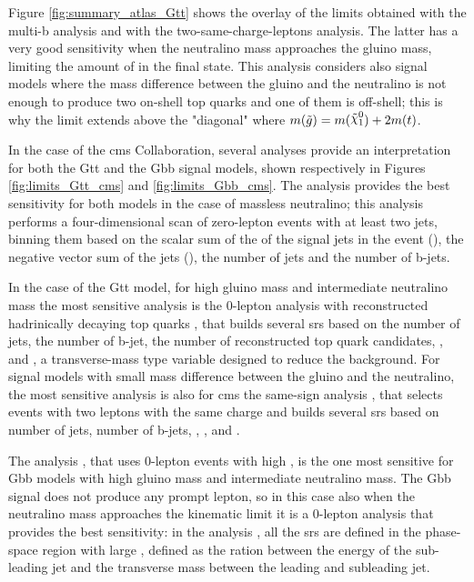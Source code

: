 Figure \ref{fig:summary_atlas_Gtt} shows the overlay of the limits obtained with the multi-b analysis and with the two-same-charge-leptons analysis.
The latter has a very good sensitivity when the neutralino mass approaches the gluino mass,
limiting the amount of \met in the final state.
This analysis considers also signal models where the mass difference between the gluino and the neutralino 
is not enough to produce two on-shell top quarks and one of them is off-shell; this is why the limit extends above 
the "diagonal" where $m(\tilde{g}) = m(\ninoone) + 2 m(t)$.


In the case of the \gls{cms} Collaboration, several analyses provide an interpretation for both the Gtt and 
the Gbb signal models, shown respectively in Figures \ref{fig:limits_Gtt_cms} and \ref{fig:limits_Gbb_cms}.
The \htmiss analysis \cite{Sirunyan:2017cwe} provides the best sensitivity for both models in the case of massless 
neutralino; this analysis performs a four-dimensional scan of zero-lepton events with at least two jets, binning them 
based on the scalar sum of the \pt of the signal jets in the event (\Ht), the negative vector sum of the jets (\htmiss), 
the number of jets and the number of b-jets. 

In the case of the Gtt model, for high gluino mass and intermediate neutralino mass the most sensitive analysis is
the 0-lepton analysis with reconstructed hadrinically decaying top quarks \cite{Sirunyan:2017pjw}, 
that builds several \glspl{sr} based on the number of jets, the number of b-jet, the number of reconstructed top quark 
candidates, \met, \Ht and \mttwo, a transverse-mass type variable designed to reduce the \ttbar background. 
For signal models with small mass difference between the gluino and the neutralino, the most sensitive analysis 
is also for \gls{cms} the same-sign analysis \cite{Sirunyan:2017uyt}, that selects events with two leptons with 
the same charge and builds several \glspl{sr} based on number of jets, number of b-jets, \met, \Ht, and \mt. 

The \mttwo analysis \cite{Sirunyan:2017kqq}, that uses 0-lepton events with high \mttwo,
 is the one most sensitive for Gbb models with high gluino mass 
and intermediate neutralino mass. 
The Gbb signal does not produce any prompt lepton, so in this case also when the neutralino mass approaches the kinematic 
limit it is a 0-lepton analysis that provides the best sensitivity: 
in the \alphat analysis \cite{Sirunyan:2018vjp}, all the \glspl{sr} are defined in the phase-space region 
with large \alphat, defined as the ration between the energy of the sub-leading jet and the transverse mass
between the leading and subleading jet. 

